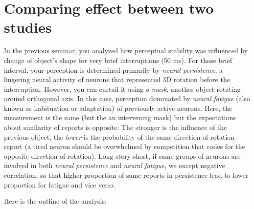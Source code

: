 \documentclass[
]{book}
\begin{document}
\hypertarget{comparing-effect-between-two-studies}{%
\section{Comparing effect between two studies}\label{comparing-effect-between-two-studies}}

In the previous seminar, you analyzed how perceptual stability was influenced by change of object's shape for very brief interruptions (50 ms). For those brief interval, your perception is determined primarily by \emph{neural persistence}, a lingering neural activity of neurons that represented 3D rotation before the interruption. However, you can curtail it using \emph{a mask}, another object rotating around orthogonal axis. In this case, perception dominated by \emph{neural fatigue} (also known as habituation or adaptation) of previously active neurons. Here, the measurement is the same (but the an intervening mask) but the expectations about similarity of reports is opposite: The stronger is the influence of the previous object, the \emph{lower} is the probability of the same direction of rotation report (a tired neuron should be overwhelmed by competition that codes for the opposite direction of rotation). Long story short, if same groups of neurons are involved in both \emph{neural persistence} and \emph{neural fatigue}, we except negative correlation, so that higher proportion of same reports in persistence lead to lower proportion for fatigue and vice versa.

Here is the outline of the analysis:
\end{document}
